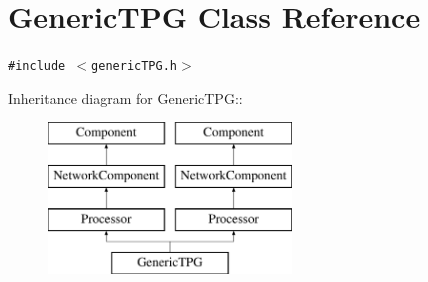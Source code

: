 \hypertarget{classGenericTPG}{
\section{GenericTPG Class Reference}
\label{classGenericTPG}
}
{\tt \#include $<$genericTPG.h$>$}

Inheritance diagram for GenericTPG::\begin{figure}[H]
\begin{center}
\leavevmode
\includegraphics[height=4cm]{classGenericTPG}
\end{center}
\end{figure}
